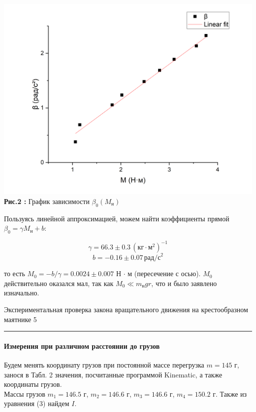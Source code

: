 \documentclass[12pt,a4paper]{scrartcl}
\begin{document}
	\begin{center}
		\includegraphics[scale=0.5]{PIC_2.png}
		\\\textbf{Рис.2 :} График зависимости $\beta_0(M_{\text{н}})$
	\end{center}
	
	Пользуясь линейной аппроксимацией, можем найти коэффициенты прямой $\beta_0 = \gamma M_{\text{н}} + b$: 
	
	$$\gamma = 66.3 \pm 0.3\,(\text{кг}\cdot\text{м}^2)^{-1}$$
	$$b = - 0.16 \pm 0.07\, \text{рад/с}^2$$
	
	 то есть $M_0 = -b / \gamma = 0.0024 \pm 0.007$ Н $\cdot$ м (пересечение с осью). $M_0$ действительно оказался мал, так как $M_0 \ll m_{\text{н}}gr$, что и было заявлено изначально.
 
 	
 	\newpage
 	
 	\begin{flushleft}
 		\footnotesize{Экспериментальная проверка закона вращательного движения на крестообразном маятнике} \hspace{\fill} \footnotesize{5}
 		\\[-0.3cm]\noindent\rule{\textwidth}{0.3pt}
 	\end{flushleft}
 	
 	\paragraph{Измерения при различном расстоянии до грузов} \hfill
 	
 	\par Будем менять координату грузов при постоянной массе перегрузка $m = 145$ г, занося в Табл. 2 значения, посчитанные программой Kinematic, а также координаты грузов. \\
 	Массы грузов $m_1 = 146.5$ г, $m_2 = 146.6$ г, $m_3 = 146.6$ г, $m_4 = 150.2$ г. Также из уравнения (3) найдем $I$.
 	
\end{document}
